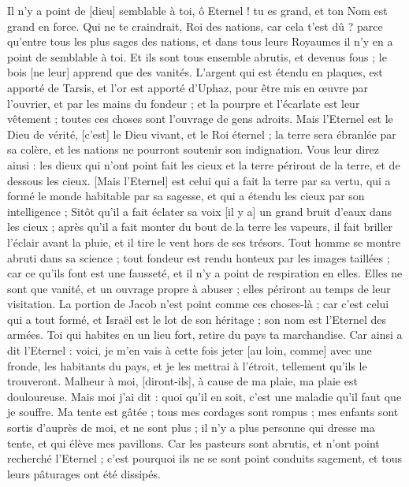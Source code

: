 \begin{multicols}{2}
Il n'y a point de [dieu] semblable à toi, ô Eternel ! tu es grand, et ton Nom est grand en force.
Qui ne te craindrait, Roi des nations, car cela t'est dû ? parce qu'entre tous les plus sages des nations, et dans tous leurs Royaumes il n'y en a point de semblable à toi.
Et ils sont tous ensemble abrutis, et devenus fous ; le bois [ne leur] apprend que des vanités.
L'argent qui est étendu en plaques, est apporté de Tarsis, et l'or est apporté d'Uphaz, pour être mis en œuvre par l'ouvrier, et par les mains du fondeur ; et la pourpre et l'écarlate est leur vêtement ; toutes ces choses sont l'ouvrage de gens adroits.
Mais l'Eternel est le Dieu de vérité, [c'est] le Dieu vivant, et le Roi éternel ; la terre sera ébranlée par sa colère, et les nations ne pourront soutenir son indignation.
Vous leur direz ainsi : les dieux qui n'ont point fait les cieux et la terre périront de la terre, et de dessous les cieux.
[Mais l'Eternel] est celui qui a fait la terre par sa vertu, qui a formé le monde habitable par sa sagesse, et qui a étendu les cieux par son intelligence ;
Sitôt qu'il a fait éclater sa voix [il y a] un grand bruit d'eaux dans les cieux ; après qu'il a fait monter du bout de la terre les vapeurs, il fait briller l'éclair avant la pluie, et il tire le vent hors de ses trésors.
Tout homme se montre abruti dans sa science ; tout fondeur est rendu honteux par les images taillées ; car ce qu'ils font est une fausseté, et il n'y a point de respiration en elles.
Elles ne sont que vanité, et un ouvrage propre à abuser ; elles périront au temps de leur visitation.
La portion de Jacob n'est point comme ces choses-là ; car c'est celui qui a tout formé, et Israël est le lot de son héritage ; son nom est l'Eternel des armées.
Toi qui habites en un lieu fort, retire du pays ta marchandise.
Car ainsi a dit l'Eternel : voici, je m'en vais à cette fois jeter [au loin, comme] avec une fronde, les habitants du pays, et je les mettrai à l'étroit, tellement qu'ils le trouveront.
Malheur à moi, [diront-ils], à cause de ma plaie, ma plaie est douloureuse. Mais moi j'ai dit : quoi qu'il en soit, c'est une maladie qu'il faut que je souffre.
Ma tente est gâtée ; tous mes cordages sont rompus ; mes enfants sont sortis d'auprès de moi, et ne sont plus ; il n'y a plus personne qui dresse ma tente, et qui élève mes pavillons.
Car les pasteurs sont abrutis, et n'ont point recherché l'Eternel ; c'est pourquoi ils ne se sont point conduits sagement, et tous leurs pâturages ont été dissipés.

\end{multicols}
